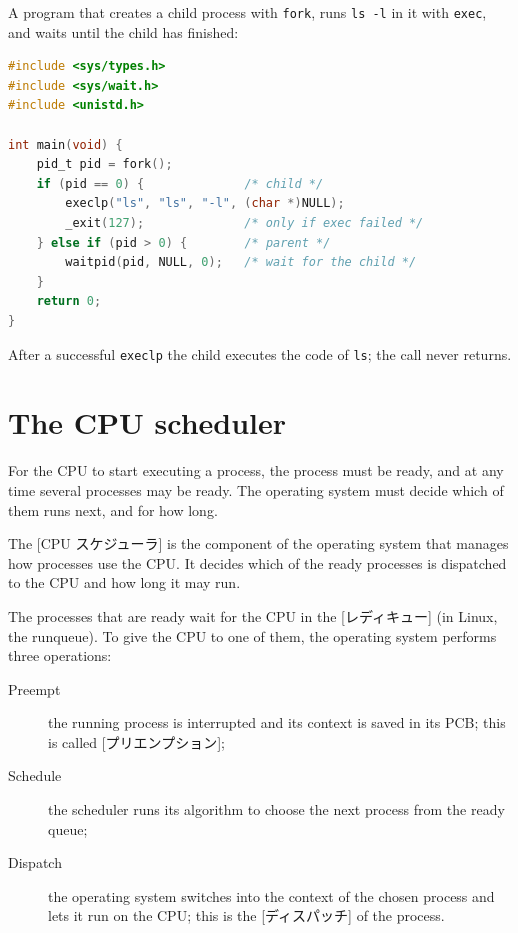 \documentclass[../main.tex]{subfiles}
\begin{document}
\begin{example}
  A program that creates a child process with \texttt{fork}, runs
  \texttt{ls -l} in it with \texttt{exec}, and waits until the child has
  finished:
  \begin{lstlisting}[language=C, numbers=none]
#include <sys/types.h>
#include <sys/wait.h>
#include <unistd.h>

int main(void) {
    pid_t pid = fork();
    if (pid == 0) {              /* child */
        execlp("ls", "ls", "-l", (char *)NULL);
        _exit(127);              /* only if exec failed */
    } else if (pid > 0) {        /* parent */
        waitpid(pid, NULL, 0);   /* wait for the child */
    }
    return 0;
}
\end{lstlisting}
  After a successful \texttt{execlp} the child executes the code of
  \texttt{ls}; the call never returns.
\end{example}

\section{The CPU scheduler}
\label{sec:l02-scheduler}

For the CPU to start executing a process, the process must be ready, and at
any time several processes may be ready.  The operating system must decide which of them
runs next, and for how long.

\begin{definition}
  The [CPU スケジューラ] is the component of the
  operating system that manages how processes use the CPU.  It decides which
  of the ready processes is dispatched to the CPU and how long it may run.
\end{definition}

The processes that are ready wait for the CPU in the
[レディキュー] (in Linux, the runqueue).  To give the CPU to one of them, the
operating system performs three operations:
\begin{description}
  \item[Preempt] the running process is interrupted and its context is
    saved in its PCB; this is called [プリエンプション];
  \item[Schedule] the scheduler runs its algorithm to choose the next
    process from the ready queue;
  \item[Dispatch] the operating system switches into the context of the
    chosen process and lets it run on the CPU; this is the
    [ディスパッチ] of the process.
\end{description}
\end{document}
